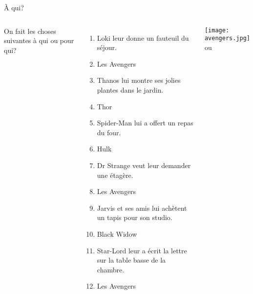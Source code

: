 \documentclass{beamer}
\begin{document}
  \begin{frame}{À qui?}
    \begin{columns}
        \scriptsize
        On fait les choses suivantes à qui ou pour qui?
        \begin{enumerate}
          \item Loki leur donne un fauteuil du séjour.
          \item<2->[$\to$] Les Avengers
          \item<3-> Thanos lui montre ses jolies plantes dans le jardin.
          \item<4->[$\to$] Thor
          \item<5-> Spider-Man lui a offert un repas du four.
          \item<6->[$\to$] Hulk
          \item<7-> Dr Strange veut leur demander une étagère.
          \item<8->[$\to$] Les Avengers
          \item<9-> Jarvis et ses amis lui achètent un tapis pour son studio.
          \item<10->[$\to$] Black Widow
          \item<11-> Star-Lord leur a écrit la lettre sur la table basse de la chambre.
          \item<12->[$\to$] Les Avengers
        \end{enumerate}
        \begin{minipage}[t][0.6\textheight]{\linewidth}
          \begin{center}
            \texttt{[image: avengers.jpg]} \\
            ou \\
            \vspace{8pt}
          \end{center}
        \end{minipage}
    \end{columns}
  \end{frame}
\end{document}
